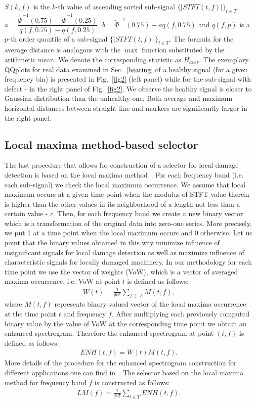 \documentclass[3p,times]{elsarticle}
\begin{document}
$S(k,f)$ is the $k$-th value of ascending sorted sub-signal $\{|STFT(t,f)|\}_{t\in T}$, $a=\dfrac{\widetilde{\Phi}^{-1}(0.75)-\widetilde{\Phi}^{-1}(0.25)}{q(f,0.75)-q(f,0.25)}$, $b=\widetilde{\Phi}^{-1}(0.75)-aq(f,0.75)$ and $q(f,p)$ is a $p$-th order quantile of a sub-signal $\{|STFT(t,f)|\}_{t\in T}$. The formula for the average distance is analogous with the $\max$ function substituted by the arithmetic mean. We denote the corresponding statistic as $H_{aver}$. The exemplary QQplots  for real data examined in Sec.~\ref{bearing} of a healthy signal (for a given frequency bin) is presented in Fig.~\ref{fig2} (left panel) while for the sub-signal with defect - in the right panel of Fig.~\ref{fig2}. We observe the healthy signal is closer to Gaussian distribution than the unhealthy one. Both average and maximum horizontal distances between straight line and markers are significantly larger in the right panel.
\subsection{Local maxima method-based selector}
The last procedure that allows for construction of a selector for local damage detection is based on the local maxima method~\cite{bib12,LMM}. For each frequency band (i.e. each sub-signal) we check the local maximum occurrence. We assume that local maximum occurs at a given time point when the modulus of STFT value therein is higher than the other values in its neighborhood of a length not less than a certain value - $r$. Then, for each frequency band we create a new binary vector which is a transformation of the original data into zero-one series. More precisely, we put 1 at a time point when the local maximum occurs and 0 otherwise. Let us point that the binary values obtained in this way minimize influence of insignificant signals for local damage detection as well as maximize influence of characteristic signals for locally damaged machinery. In our methodology for each time point we use the vector of weights (VoW), which is a vector of averaged maxima occurrence, i.e. VoW at point $t$ is defined as follows:
\begin{eqnarray}
W(t)=\frac{1}{\#\textit{F}}\sum_{f\in\textit{ F}}M(t,f),
\end{eqnarray}
where $M(t,f)$  represents binary valued vector of the local maxima occurrence at the time point  $t$ and frequency $f$. After multiplying each previously computed binary value by the value of VoW at the corresponding time point we obtain an enhanced spectrogram. Therefore the enhanced spectrogram at point $(t,f)$ is defined as follows:
\begin{eqnarray}
ENH(t,f)=W(t)M(t,f).
\end{eqnarray}
More details of the procedure for the enhanced spectrogram construction for different applications one can find in~\cite{bib12}. The selector based on the local maxima method for frequency band $f$ is constructed as follows:
\begin{eqnarray}
LM(f)=\frac{1}{\#T}\sum_{t\in T}ENH(t,f).
\end{eqnarray}
\end{document}
